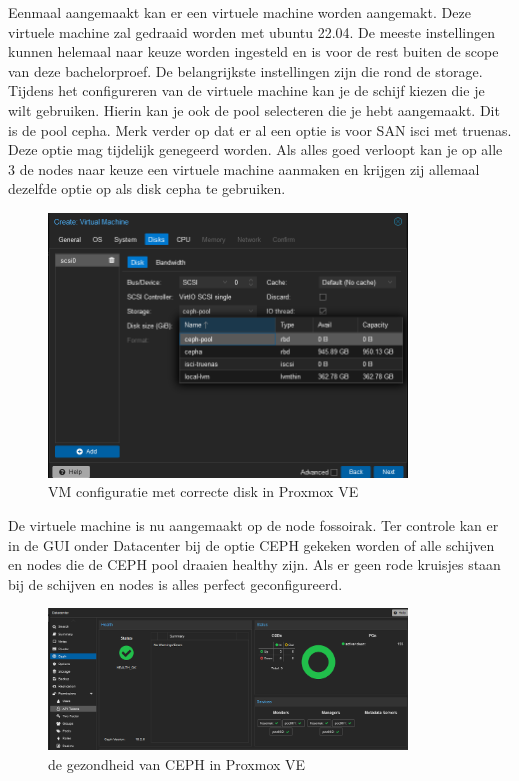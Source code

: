 Eenmaal aangemaakt kan er een virtuele machine worden aangemakt. Deze virtuele machine zal gedraaid worden met ubuntu 22.04.
De meeste instellingen kunnen helemaal naar keuze worden ingesteld en is voor de rest buiten de scope van deze bachelorproef. De belangrijkste instellingen zijn die rond de storage.
Tijdens het configureren van de virtuele machine kan je de schijf kiezen die je wilt gebruiken. Hierin kan je ook de pool selecteren die je hebt aangemaakt. Dit is de pool cepha.
Merk verder op dat er al een optie is voor SAN isci met truenas. Deze optie mag tijdelijk genegeerd worden.
Als alles goed verloopt kan je op alle 3 de nodes naar keuze een virtuele machine aanmaken en krijgen zij allemaal dezelfde optie op als disk cepha te gebruiken.
\begin{figure}[H]
  \centering
  \includegraphics[width=0.85\textwidth]{../poc/vm-storage-prox.png}
  \caption{VM configuratie met correcte disk in Proxmox VE}
  \label{fig:vm-storage-proxmox}
\end{figure}

De virtuele machine is nu aangemaakt op de node fossoirak.
Ter controle kan er in de GUI onder Datacenter bij de optie CEPH gekeken worden of alle schijven en nodes die de CEPH pool draaien healthy zijn.
Als er geen rode kruisjes staan bij de schijven en nodes is alles perfect geconfigureerd.
\begin{figure}[H]
  \centering
  \includegraphics[width=0.85\textwidth]{../poc/ceph-healthy-prox.png}
  \caption{de gezondheid van CEPH  in Proxmox VE}
  \label{fig:ceph-healthy-prox}
\end{figure}

